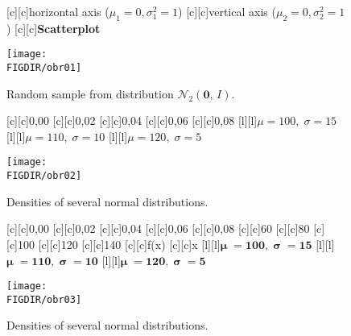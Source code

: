 \begin{figure}[p]\centering
{}[c][c]{\textsf{\large horizontal axis ($\mu_1 = 0, \sigma_1^2 = 1$)}}
[c][c]{\textsf{\large vertical axis ($\mu_2 = 0, \sigma_2^2 = 1$)}}
[c][c]{\textsf{\bfseries\Large Scatterplot}}

\texttt{[image: \\FIGDIR/obr01]}     

\caption{Random sample from distribution $\mathcal{N}_2(\boldsymbol{0},\,I)$.}
\label{obr03:Nvyber}

\end{figure}


\begin{figure}[p]\centering
{}[c][c]{\textsf{0{,}00}}  
[c][c]{\textsf{0{,}02}}  
[c][c]{\textsf{0{,}04}}
[c][c]{\textsf{0{,}06}}  
[c][c]{\textsf{0{,}08}}
[l][l]{\textsf{\large $\mu = 100,\; \sigma = 15$}}
[l][l]{\textsf{\large $\mu = 110,\; \sigma = 10$}}
[l][l]{\textsf{\large $\mu = 120,\; \sigma = 5$}}

\texttt{[image: \\FIGDIR/obr02]}

\caption{Densities of several normal distributions.}
\label{obr03:Nhust}

\end{figure}


\begin{figure}[p]\centering
{}[c][c]{\textsf{\small 0{,}00}}  
[c][c]{\textsf{\small 0{,}02}}  
[c][c]{\textsf{\small 0{,}04}}
[c][c]{\textsf{\small 0{,}06}}  
[c][c]{\textsf{\small 0{,}08}}
[c][c]{\textsf{\small 60}}    
[c][c]{\textsf{\small 80}}  
[c][c]{\textsf{\small 100}}
[c][c]{\textsf{\small 120}}  
[c][c]{\textsf{\small 140}}
[c][c]{\textsf{\small f(x)}}      
[c][c]{\textsf{\small x}}
[l][l]{\textsf{\large $\boldsymbol{\mu} \mathbf{\;= 100,}\; \boldsymbol{\sigma} \mathbf{\;= 15}$}}
[l][l]{\textsf{\large $\boldsymbol{\mu} \mathbf{\;= 110,}\; \boldsymbol{\sigma} \mathbf{\;= 10}$}}
[l][l]{\textsf{\large $\boldsymbol{\mu}  \mathbf{\;= 120,}\; \boldsymbol{\sigma} \mathbf{\;= 5}$}}

\texttt{[image: \\FIGDIR/obr03]}

\caption{Densities of several normal distributions.}
\label{obr03:Nhust:podruhe}

\end{figure}

